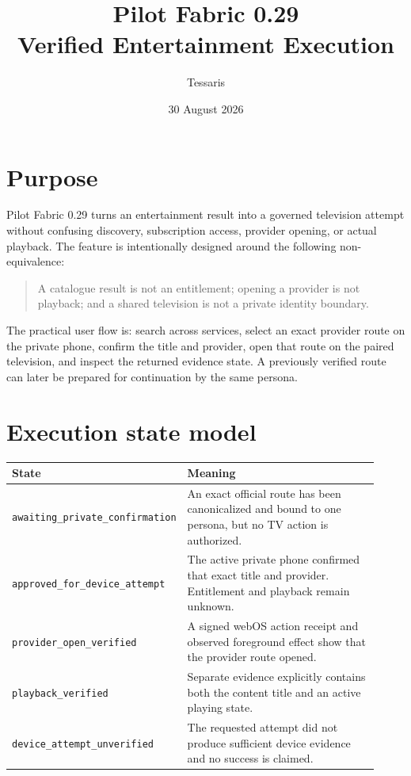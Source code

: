\documentclass[11pt,a4paper]{article}
\title{Pilot Fabric 0.29\\Verified Entertainment Execution}
\author{Tessaris}
\date{30 August 2026}
\begin{document}
\maketitle

\section{Purpose}

Pilot Fabric 0.29 turns an entertainment result into a governed television
attempt without confusing discovery, subscription access, provider opening, or
actual playback.  The feature is intentionally designed around the following
non-equivalence:

\begin{quote}
A catalogue result is not an entitlement; opening a provider is not playback;
and a shared television is not a private identity boundary.
\end{quote}

The practical user flow is: search across services, select an exact provider
route on the private phone, confirm the title and provider, open that route on
the paired television, and inspect the returned evidence state.  A previously
verified route can later be prepared for continuation by the same persona.

\section{Execution state model}

\begin{longtable}{p{0.28\linewidth}p{0.64\linewidth}}
\toprule
\textbf{State} & \textbf{Meaning} \\
\midrule
\endhead
\nolinkurl{awaiting_private_confirmation} & An exact official route has been
canonicalized and bound to one persona, but no TV action is authorized. \\
\nolinkurl{approved_for_device_attempt} & The active private phone confirmed
that exact title and provider.  Entitlement and playback remain unknown. \\
\nolinkurl{provider_open_verified} & A signed webOS action receipt and observed
foreground effect show that the provider route opened. \\
\nolinkurl{playback_verified} & Separate evidence explicitly contains both the
content title and an active playing state. \\
\nolinkurl{device_attempt_unverified} & The requested attempt did not produce
sufficient device evidence and no success is claimed. \\
\bottomrule
\end{longtable}
\end{document}
